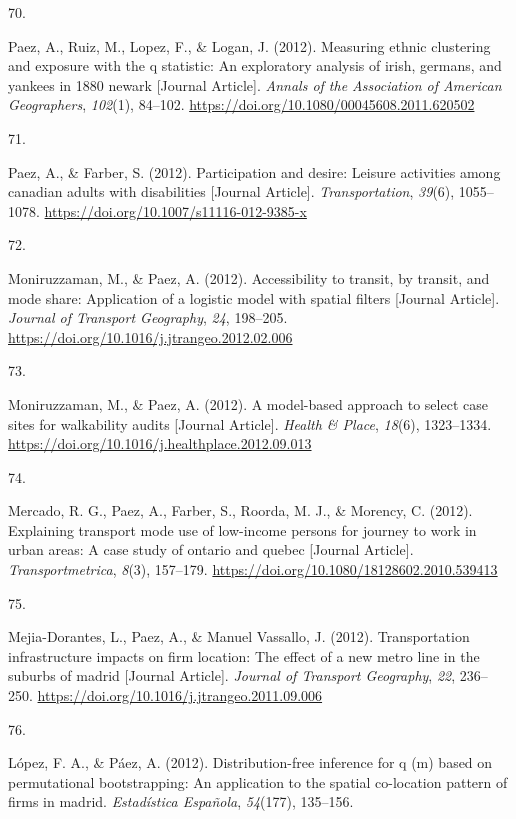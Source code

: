 \documentclass[10pt,a4paper,]{twentysecondcv}
\newlength{\csllabelwidth}
\newcommand{\CSLLeftMargin}[1]{\parbox[t]{\csllabelwidth}{#1}}
\newcommand{\CSLRightInline}[1]{\parbox[t]{\linewidth - \csllabelwidth}{#1}}
\begin{document}
\leavevmode{}%
\CSLLeftMargin{70. }%
\CSLRightInline{Paez, A., Ruiz, M., Lopez, F., \& Logan, J. (2012).
Measuring ethnic clustering and exposure with the q statistic: An
exploratory analysis of irish, germans, and yankees in 1880 newark
{[}Journal Article{]}. \emph{Annals of the Association of American
Geographers}, \emph{102}(1), 84--102.
\url{https://doi.org/10.1080/00045608.2011.620502}}

\leavevmode{}%
\CSLLeftMargin{71. }%
\CSLRightInline{Paez, A., \& Farber, S. (2012). Participation and
desire: Leisure activities among canadian adults with disabilities
{[}Journal Article{]}. \emph{Transportation}, \emph{39}(6), 1055--1078.
\url{https://doi.org/10.1007/s11116-012-9385-x}}

\leavevmode{}%
\CSLLeftMargin{72. }%
\CSLRightInline{Moniruzzaman, M., \& Paez, A. (2012). Accessibility to
transit, by transit, and mode share: Application of a logistic model
with spatial filters {[}Journal Article{]}. \emph{Journal of Transport
Geography}, \emph{24}, 198--205.
\url{https://doi.org/10.1016/j.jtrangeo.2012.02.006}}

\leavevmode{}%
\CSLLeftMargin{73. }%
\CSLRightInline{Moniruzzaman, M., \& Paez, A. (2012). A model-based
approach to select case sites for walkability audits {[}Journal
Article{]}. \emph{Health \& Place}, \emph{18}(6), 1323--1334.
\url{https://doi.org/10.1016/j.healthplace.2012.09.013}}

\leavevmode{}%
\CSLLeftMargin{74. }%
\CSLRightInline{Mercado, R. G., Paez, A., Farber, S., Roorda, M. J., \&
Morency, C. (2012). Explaining transport mode use of low-income persons
for journey to work in urban areas: A case study of ontario and quebec
{[}Journal Article{]}. \emph{Transportmetrica}, \emph{8}(3), 157--179.
\url{https://doi.org/10.1080/18128602.2010.539413}}

\leavevmode{}%
\CSLLeftMargin{75. }%
\CSLRightInline{Mejia-Dorantes, L., Paez, A., \& Manuel Vassallo, J.
(2012). Transportation infrastructure impacts on firm location: The
effect of a new metro line in the suburbs of madrid {[}Journal
Article{]}. \emph{Journal of Transport Geography}, \emph{22}, 236--250.
\url{https://doi.org/10.1016/j.jtrangeo.2011.09.006}}

\leavevmode{}%
\CSLLeftMargin{76. }%
\CSLRightInline{López, F. A., \& Páez, A. (2012). Distribution-free
inference for q (m) based on permutational bootstrapping: An application
to the spatial co-location pattern of firms in madrid. \emph{Estadística
Española}, \emph{54}(177), 135--156.}
\end{document}
